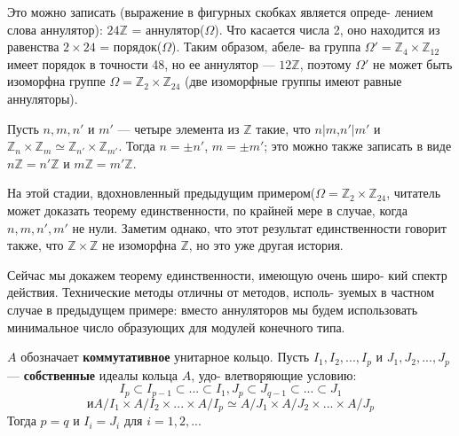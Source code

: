 Это можно записать (выражение в фигурных скобках является опреде- \linebreak лением слова аннулятор): $24\mathbb{Z}$ = аннулятор($\Omega$). Что касается числа 2, \linebreak оно находится из равенства $2 \times 24$ = порядок($\Omega$). Таким образом, абеле- \linebreak ва группа ${\Omega}' = \mathbb{Z}_4 \times \mathbb{Z}_{12}$ имеет порядок в точности 48, но ее аннулятор --- \linebreak $12\mathbb{Z}$, поэтому ${\Omega}'$ не может быть изоморфна группе $\Omega = \mathbb{Z}_2 \times \mathbb{Z}_{24}$ (две \linebreak изоморфные группы имеют равные аннуляторы). 
\begin{predl}

Пусть $n, m, n'$ и $m'$ --- четыре элемента из $\mathbb{Z}$ такие, что $n | m$,\linebreak $n' | m'$ и $\mathbb{Z}_n \times \mathbb{Z}_m \simeq \mathbb{Z}_{n'} \times \mathbb{Z}_{m'}$. Тогда $n = \pm n'$, $m = \pm m'$; это можно \linebreak также записать в виде $n\mathbb{Z} = n'\mathbb{Z}$ и $m\mathbb{Z} = m' \mathbb{Z}$. 

На этой стадии, вдохновленный предыдущим примером\linebreak ($\Omega = \mathbb{Z}_2 \times \mathbb{Z}_{24}$, читатель может доказать теорему единственности, по \linebreak крайней мере в случае, когда $n, m, n', m'$ не нули. Заметим однако, что \linebreak этот результат единственности говорит также, что $\mathbb{Z} \times \mathbb{Z}$ не изоморфна \linebreak $\mathbb{Z}$, но это уже другая история. 

Сейчас мы докажем теорему единственности, имеющую очень широ- \linebreak кий спектр действия. Технические методы отличны от методов, исполь- \linebreak зуемых в частном случае в предыдущем примере: вместо аннуляторов \linebreak мы будем использовать минимальное число образующих для модулей \linebreak конечного типа.
\end{predl}
\begin{thm}[единственности.]

$A$ обозначает \textbf{коммутативное} унитарное кольцо. Пусть \linebreak $I_1, I_2, ..., I_p$ и $J_1, J_2, ..., J_p$ --- \textbf{собственные} идеалы кольца $A$, удо- \linebreak влетворяющие условию: 
$$I_p \subset I_{p-1}\subset ... \subset I_1, J_p \subset J_{q-1}\subset ... \subset J_1$$
$$и A/I_1 \times A/I_2 \times ... \times A/I_p \simeq A/J_1 \times A/J_2 \times ... \times A/J_p$$
Тогда $p = q$ и $I_i = J_i$ для $i = 1, 2, ...$ 
\end{thm}
